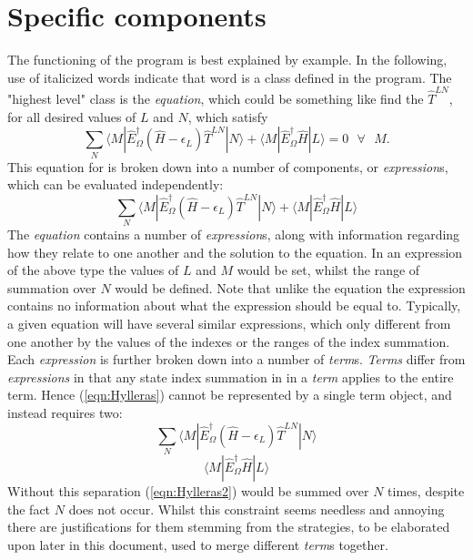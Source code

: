 \section{Specific components}
The functioning of the program is best explained by example. In the following,
use of italicized words indicate that word is a class defined in the program.
The "highest level" class is the \emph{equation}, which could be something like 
find the $\hat{T}^{LN}$, for all desired values of $L$ and $N$, which satisfy 
\begin{equation}
\sum_{N} 
\langle M | \hat{E}^{\dagger}_{\Omega} (\hat{H}-\epsilon_{L}) \hat{T}^{LN} | N \rangle  +
\langle M | \hat{E}^{\dagger}_{\Omega} \hat{H} | L  \rangle = 0 \text{ \ \ \ \ } \forall \text{ \ \ }  M . 
\end{equation}
\noindent This equation for is broken down into a number of components, 
or \emph{expression}s, which can be evaluated independently:
\begin{equation}
\sum_{N} 
\langle M | \hat{E}^{\dagger}_{\Omega} (\hat{H}-\epsilon_{L}) \hat{T}^{LN} | N \rangle  +
\langle M | \hat{E}^{\dagger}_{\Omega} \hat{H} | L  \rangle  
\label{eqn:Hylleras}
\end{equation}
\noindent The \emph{equation} contains a number of \emph{expression}s, along with
information regarding how they relate to one another and the solution to the equation.
In an expression of the above type the values of $L$ and $M$  would be set, whilst the range of
summation over $N$ would be defined. Note that unlike the equation the expression
contains no information about what the expression should be equal to.
Typically, a given equation will have several similar expressions,
which only different from one another by the values of the indexes or the 
ranges of the index summation.\\

\noindent Each \emph{expression} is further broken down into a number of \emph{term}s.
\emph{Terms} differ from \emph{expressions} in that any state index summation in
in a \emph{term} applies to the entire term.
Hence (\ref{eqn:Hylleras}) cannot be represented by a single term object, and instead
requires two:
\begin{equation}
\sum_{N} 
\langle M | \hat{E}^{\dagger}_{\Omega} (\hat{H}-\epsilon_{L}) \hat{T}^{LN} | N \rangle  
\label{eqn:Hylleras1}
\end{equation}
\begin{equation}
\langle M | \hat{E}^{\dagger}_{\Omega} \hat{H} | L  \rangle  
\label{eqn:Hylleras2}
\end{equation}
\noindent Without this separation (\ref{eqn:Hylleras2}) would be summed over $N$ times,
despite the fact $N$ does not occur. 
Whilst this constraint seems needless and annoying there are justifications for them stemming
from the strategies, to be elaborated upon later in this document, used to merge different \emph{term}s together. \\ 

